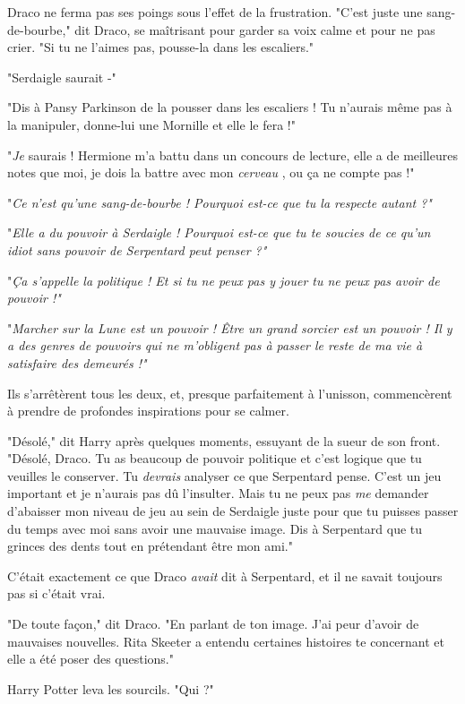 Draco ne ferma pas ses poings sous l'effet de la frustration. "C'est juste une sang-de-bourbe," dit Draco, se maîtrisant pour garder sa voix calme et pour ne pas crier. "Si tu ne l'aimes pas, pousse-la dans les escaliers."

"Serdaigle saurait -"

"Dis à Pansy Parkinson de la pousser dans les escaliers ! Tu n'aurais même pas à la manipuler, donne-lui une Mornille et elle le fera !"

"\emph{Je}  saurais ! Hermione m'a battu dans un concours de lecture, elle a de meilleures notes que moi, je dois la battre avec mon \emph{cerveau} , ou ça ne compte pas !"

"\emph{Ce n'est qu'une sang-de-bourbe ! Pourquoi est-ce que tu la respecte autant ?"} 

"\emph{Elle a du pouvoir à Serdaigle ! Pourquoi est-ce que tu te soucies de ce qu'un idiot sans pouvoir de Serpentard peut penser ?"} 

"\emph{Ça s'appelle la politique ! Et si tu ne peux pas y jouer tu ne peux pas avoir de pouvoir !"} 

"\emph{Marcher sur la Lune est un pouvoir ! Être un grand sorcier est un pouvoir ! Il y a des genres de pouvoirs qui ne m'obligent pas à passer le reste de ma vie à satisfaire des demeurés !"} 

Ils s'arrêtèrent tous les deux, et, presque parfaitement à l'unisson, commencèrent à prendre de profondes inspirations pour se calmer.

"Désolé," dit Harry après quelques moments, essuyant de la sueur de son front. "Désolé, Draco. Tu as beaucoup de pouvoir politique et c'est logique que tu veuilles le conserver. Tu \emph{devrais}  analyser ce que Serpentard pense. C'est un jeu important et je n'aurais pas dû l'insulter. Mais tu ne peux pas \emph{me}  demander d'abaisser mon niveau de jeu au sein de Serdaigle juste pour que tu puisses passer du temps avec moi sans avoir une mauvaise image. Dis à Serpentard que tu grinces des dents tout en prétendant être mon ami."

C'était exactement ce que Draco \emph{avait}  dit à Serpentard, et il ne savait toujours pas si c'était vrai.

"De toute façon," dit Draco. "En parlant de ton image. J'ai peur d'avoir de mauvaises nouvelles. Rita Skeeter a entendu certaines histoires te concernant et elle a été poser des questions."

Harry Potter leva les sourcils. "Qui ?"

